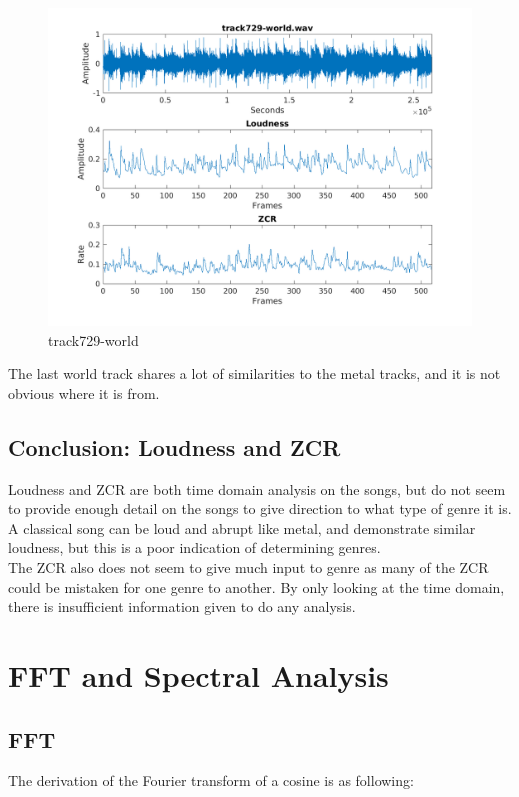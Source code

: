 \documentclass[11pt, a4paper]{article}
\begin{document}
\begin{figure}[H]
    \centering
    \includegraphics[width=.8\textwidth]{track729-world-timedomain.png}
    \caption{track729-world}
\end{figure}

The last world track shares a lot of similarities to the metal tracks, and it is not obvious where it is from. \\

\subsection{Conclusion: Loudness and ZCR}

Loudness and ZCR are both time domain analysis on the songs, but do not seem to provide enough detail on the songs to give direction to what type of genre it is. A classical song can be loud and abrupt like metal, and demonstrate similar loudness, but this is a poor indication of determining genres. \\

The ZCR also does not seem to give much input to genre as many of the ZCR could be mistaken for one genre to another. By only looking at the time domain, there is insufficient information given to do any analysis. \\


\section{FFT and Spectral Analysis}

\subsection{FFT}
The derivation of the Fourier transform of a cosine is as following:
\end{document}
